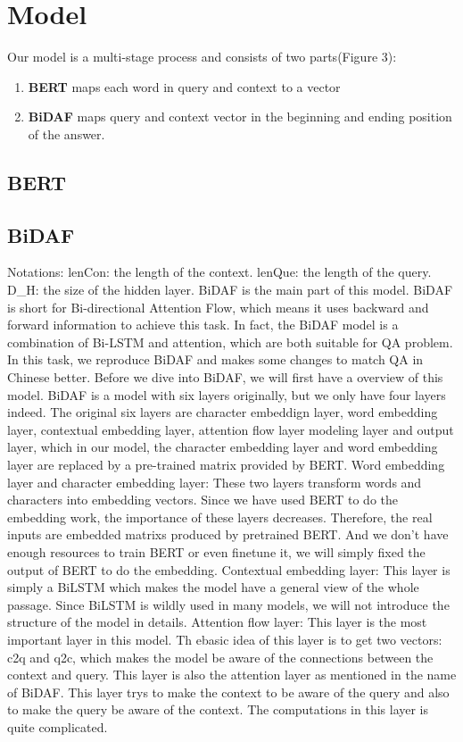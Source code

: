 \documentclass{article}
\begin{document}
\section{Model}
\noindent Our model is a multi-stage process and consists of two parts(Figure 3):\\
\begin{enumerate}
	\item \textbf{BERT} maps each word in query and context to a vector  
	\item \textbf{BiDAF} maps query and context vector in the beginning and ending position of the answer.
\end{enumerate}
\subsection{BERT}
\subsection{BiDAF}
Notations: 
lenCon: the length of the context.
lenQue: the length of the query.
D_H: the size of the hidden layer.
BiDAF is the main part of this model. BiDAF is short for Bi-directional Attention Flow, which means it uses backward and forward information to achieve this task. In fact, the BiDAF model is a combination of Bi-LSTM and attention, which are both suitable for QA problem.
In this task, we reproduce BiDAF and makes some changes to match QA in Chinese better. Before we dive into BiDAF, we will first have a overview of this model. BiDAF is a model with six layers originally, but we only have four layers indeed. The original six layers are character embeddign layer, word embedding layer, contextual embedding layer, attention flow layer modeling layer and output layer, which in our model, the character embedding layer and word embedding layer are replaced by a pre-trained matrix provided by BERT. 
Word embedding layer and character embedding layer: These two layers transform words and characters into embedding vectors. Since we have used BERT to do the embedding work, the importance of these layers decreases. Therefore, the real inputs are embedded matrixs produced by pretrained BERT. And we don't have enough resources to train BERT or even finetune it, we will simply fixed the output of BERT to do the embedding.
Contextual embedding layer: This layer is simply a BiLSTM which makes the model have a general view of the whole passage. Since BiLSTM is wildly used in many models, we will not introduce the structure of the model in details. 
Attention flow layer: This layer is the most important layer in this model. Th ebasic idea of this layer is to get two vectors: c2q and q2c, which makes the model be aware of the connections between the context and query. This layer is also the attention layer as mentioned in the name of BiDAF. This layer trys to make the context to be aware of the query and also to make the query be aware of the context. The computations in this layer is quite complicated. 
\end{document}
